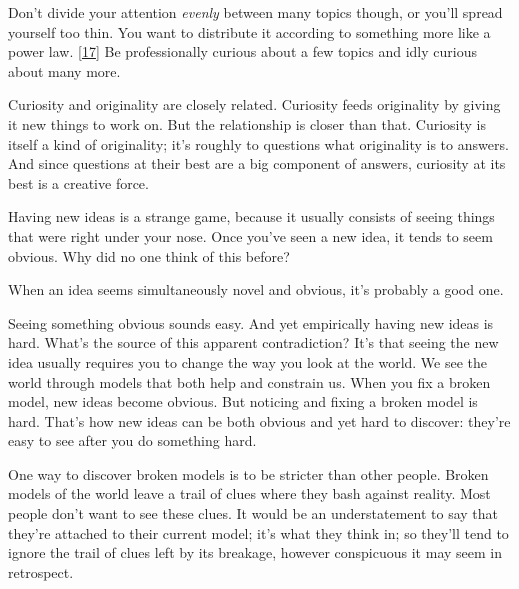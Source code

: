 Don't divide your
                  attention \emph{evenly} between many topics though, or you'll
                  spread yourself too thin. You want to distribute it according
                  to something more like a power law.
                  [\href{\#f17n}{17}]
                  Be professionally curious about a few topics and idly curious
                  about many more.

Curiosity and originality are
                  closely related. Curiosity feeds originality by giving it new
                  things to work on. But the relationship is closer than that.
                  Curiosity is itself a kind of originality; it's roughly to
                  questions what originality is to answers. And since questions
                  at their best are a big component of answers, curiosity at its
                  best is a creative force.






                  Having new ideas is a strange game, because it usually
                  consists of seeing things that were right under your nose.
                  Once you've seen a new idea, it tends to seem obvious. Why did
                  no one think of this before?

When an idea seems
                  simultaneously novel and obvious, it's probably a good one.

Seeing
                  something obvious sounds easy. And yet empirically having new
                  ideas is hard. What's the source of this apparent
                  contradiction? It's that seeing the new idea usually requires
                  you to change the way you look at the world. We see the world
                  through models that both help and constrain us. When you fix a
                  broken model, new ideas become obvious. But noticing and
                  fixing a broken model is hard. That's how new ideas can be
                  both obvious and yet hard to discover: they're easy to see
                  after you do something hard.

One way to discover
                  broken models is to be stricter than other people. Broken
                  models of the world leave a trail of clues where they bash
                  against reality. Most people don't want to see these clues. It
                  would be an understatement to say that they're attached to
                  their current model; it's what they think in; so they'll tend
                  to ignore the trail of clues left by its breakage, however
                  conspicuous it may seem in retrospect.

